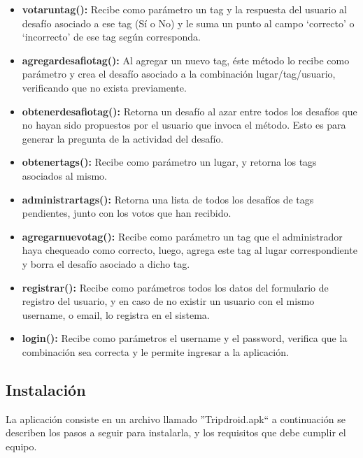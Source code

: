 \documentclass[10pt,letterpaper]{article}
\begin{document}
\begin{itemize}
\item \textbf{votaruntag():} Recibe como parámetro un tag y la respuesta del usuario al desafío asociado a ese tag (Sí o No) y le suma un punto al campo ‘correcto’ o ‘incorrecto’ de ese tag según corresponda.

\item \textbf{agregardesafiotag():} Al agregar un nuevo tag, éste método lo recibe como parámetro y crea el desafío asociado a la combinación lugar/tag/usuario, verificando que no exista previamente.

\item \textbf{obtenerdesafiotag():} Retorna un desafío al azar entre todos los desafíos que no hayan sido propuestos por el usuario que invoca el método. Esto es para generar la pregunta de la actividad del desafío.

\item \textbf{obtenertags():} Recibe como parámetro un lugar, y retorna los tags asociados al mismo.

\item \textbf{administrartags():} Retorna una lista de todos los desafíos de tags pendientes, junto con los votos que han recibido.

\item \textbf{agregarnuevotag():} Recibe como parámetro un tag que el administrador haya chequeado como correcto, luego, agrega este tag al lugar correspondiente y borra el desafío asociado a dicho tag.

\item \textbf{registrar():} Recibe como parámetros todos los datos del formulario de registro del usuario, y en caso de no existir un usuario con el mismo username, o email, lo registra en el sistema.

\item \textbf{login():} Recibe como parámetros el username y el password, verifica que la combinación sea correcta y le permite ingresar a la aplicación.

\end{itemize}

\subsection{Instalación}

La aplicación consiste en un archivo llamado ''Tripdroid.apk`` a continuación se describen los pasos a seguir para instalarla, y los requisitos que debe cumplir el equipo.\\
\end{document}
